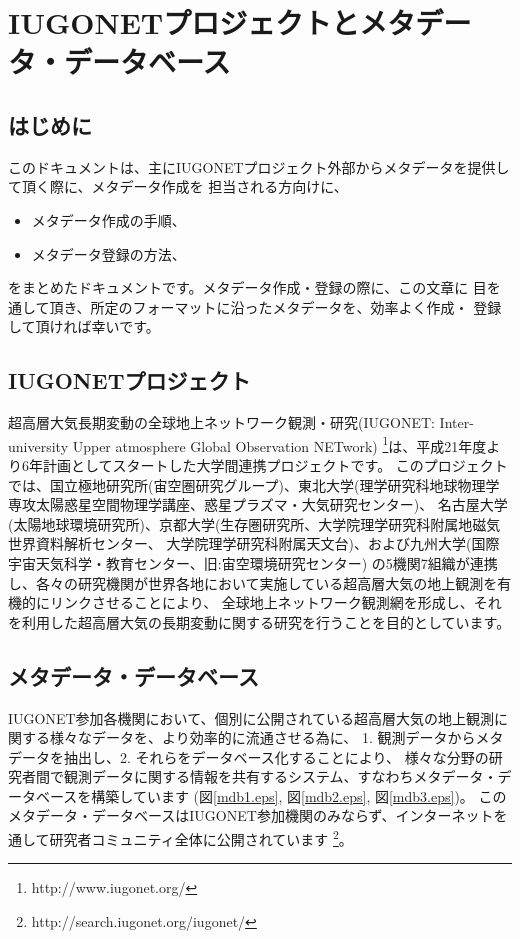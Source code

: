 \chapter{IUGONETプロジェクトとメタデータ・データベース}

\section{はじめに}
 このドキュメントは、主にIUGONETプロジェクト外部からメタデータを提供して頂く際に、メタデータ作成を
担当される方向けに、
\begin{itemize}
\item メタデータ作成の手順、
\item メタデータ登録の方法、
\end{itemize}
をまとめたドキュメントです。メタデータ作成・登録の際に、この文章に
目を通して頂き、所定のフォーマットに沿ったメタデータを、効率よく作成・
登録して頂ければ幸いです。

\section{IUGONETプロジェクト}
 超高層大気長期変動の全球地上ネットワーク観測・研究(IUGONET: Inter-university Upper atmosphere Global Observation NETwork)
\footnote{http://www.iugonet.org/}は、平成21年度より6年計画としてスタートした大学間連携プロジェクトです。
このプロジェクトでは、国立極地研究所(宙空圏研究グループ)、東北大学(理学研究科地球物理学専攻太陽惑星空間物理学講座、惑星プラズマ・大気研究センター)、
名古屋大学(太陽地球環境研究所)、京都大学(生存圏研究所、大学院理学研究科附属地磁気世界資料解析センター、
大学院理学研究科附属天文台)、および九州大学(国際宇宙天気科学・教育センター、旧:宙空環境研究センター)
の5機関7組織が連携し、各々の研究機関が世界各地において実施している超高層大気の地上観測を有機的にリンクさせることにより、
全球地上ネットワーク観測網を形成し、それを利用した超高層大気の長期変動に関する研究を行うことを目的としています。\par

\section{メタデータ・データベース}
 IUGONET参加各機関において、個別に公開されている超高層大気の地上観測に関する様々なデータを、より効率的に流通させる為に、
1. 観測データからメタデータを抽出し、2. それらをデータベース化することにより、
様々な分野の研究者間で観測データに関する情報を共有するシステム、すなわちメタデータ・データベースを構築しています
(図\ref{mdb1.eps}, 図\ref{mdb2.eps}, 図\ref{mdb3.eps})。
このメタデータ・データベースはIUGONET参加機関のみならず、インターネットを
通して研究者コミュニティ全体に公開されています
\footnote{http://search.iugonet.org/iugonet/}。

